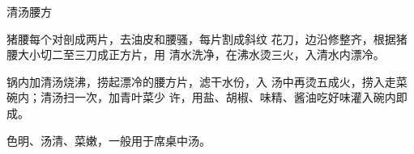 \begin{recipe}{清汤腰方}

\ingredients


\cooking

\step 	猪腰每个对剖成两片，去油皮和腰骚，每片割成斜纹 花刀，边沿修整齐，根据猪腰大小切二至三刀成正方片，用 清水洗净，在沸水烫三火，入清水内漂冷。

\step 	锅内加清汤烧沸，捞起漂冷的腰方片，滤干水份，入 汤中再烫五成火，捞入走菜碗内；清汤扫一次，加青叶菜少 许，用盐、胡椒、味精、酱油吃好味灌入碗内即成。

\notes

色明、汤清、菜嫩，一般用于席桌中汤。

\end{recipe}

